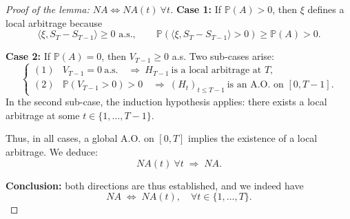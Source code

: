 \begin{proof}[Proof of the lemma: $NA \Longleftrightarrow NA(t)\ \forall t$]
\textbf{Case 1:} If $\mathbb{P}(A) > 0$, then $\xi$ defines a local arbitrage because
\[
\langle \xi, S_T - S_{T-1} \rangle \ge 0 \text{ a.s.}, 
\qquad 
\mathbb{P}(\langle \xi, S_T - S_{T-1} \rangle > 0) \ge \mathbb{P}(A) > 0.
\]

\textbf{Case 2:} If $\mathbb{P}(A) = 0$, then $V_{T-1} \ge 0$ a.s.  
Two sub-cases arise:
\[
\begin{cases}
(1) & V_{T-1} = 0\ \text{a.s.} 
\quad \Rightarrow\ H_{T-1}\ \text{is a local arbitrage at } T, \\[0.5em]
(2) & \mathbb{P}(V_{T-1}>0) > 0 
\quad \Rightarrow\ (H_t)_{t\le T-1}\ \text{is an A.O. on } [0,T-1].
\end{cases}
\]
In the second sub-case, the induction hypothesis applies: there exists a local arbitrage 
at some $t \in \{1,\ldots,T-1\}$.

Thus, in all cases, a global A.O. on $[0,T]$ implies the existence of a local arbitrage.  
We deduce:
\[
NA(t)\ \forall t \;\Rightarrow\; NA.
\]

\textbf{Conclusion:} both directions are thus established, and we indeed have
\[
NA \;\Longleftrightarrow\; NA(t), \quad \forall t\in\{1,\ldots,T\}.
\]
\end{proof}
